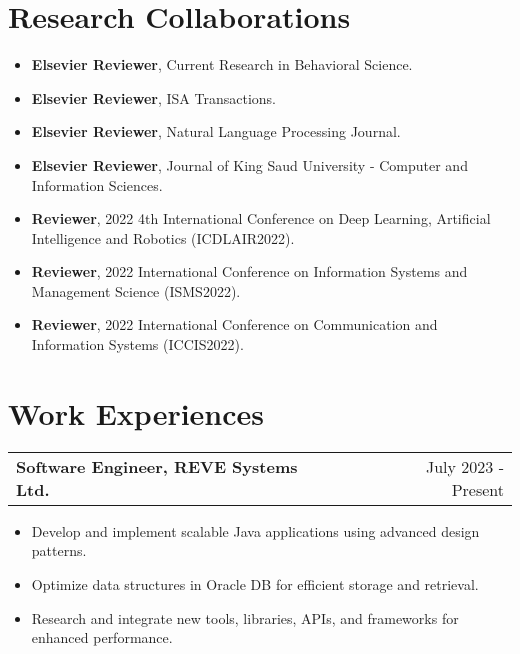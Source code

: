 \documentclass[a4paper, 12pt]{article}
\makeatletter
\newenvironment{joblong}[2]{
    \begin{tabularx}
    {\linewidth}{@{}l X r@{}}
        \textbf{#1} & \hfill & #2 \\[3.75pt]
    \end{tabularx}
    \begin{minipage}[t]{\linewidth}
        \begin{itemize}[nosep,after=\strut, leftmargin=1em,
            itemsep=3pt,label=\textbullet] }{ \end{itemize}
    \end{minipage} }
\makeatother
\begin{document}
    \section{\textbf{Research Collaborations}}

    \begin{itemize}[leftmargin=*,itemsep=2pt,parsep=0pt]
        \item \textbf{Elsevier Reviewer}, Current Research in Behavioral Science.

        \item \textbf{Elsevier Reviewer}, ISA Transactions.

        \item \textbf{Elsevier Reviewer}, Natural Language Processing Journal.

        \item \textbf{Elsevier Reviewer}, Journal of King Saud University - Computer
        and Information Sciences.

        \item \textbf{Reviewer}, 2022 4th International Conference on Deep Learning,
        Artificial Intelligence and Robotics (ICDLAIR2022).

        \item \textbf{Reviewer}, 2022 International Conference on Information Systems
        and Management Science (ISMS2022).

        \item \textbf{Reviewer}, 2022 International Conference on Communication and Information
        Systems (ICCIS2022).
    \end{itemize}


    \section{\textbf{Work Experiences}}

    \begin{joblong}
    {Software Engineer, REVE Systems Ltd.}{July 2023 - Present}
        \item Develop
        and implement scalable Java applications using advanced design patterns. \item
        Optimize data structures in Oracle DB for efficient storage and retrieval.
        \item Research and integrate new tools, libraries, APIs, and frameworks for enhanced
        performance.
    \end{joblong}
\end{document}
